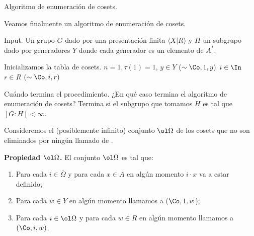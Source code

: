 \documentclass[aspectratio=169, 9pt]{beamer}
\begin{document}
\begin{frame}[fragile]{Algoritmo de enumeración de cosets.}

Veamos finalmente un algoritmo de enumeración de cosets.


\begin{alertblock}{Input.}
	Un grupo $G$ dado por una presentación finita $\langle X | R \rangle$ y $H$ un subgrupo \fg dado por generadores $Y$ donde cada generador es un elemento de $A^*$.
\end{alertblock}
\pause
\begin{codebox}
	\li  \Comment Inicializamos la tabla de cosets.
	\li $n=1, \tau(1)=1$,
	\li \For  $y \in Y$ 
		\Do \li \scanfill$(\sim \Co, 1, y)$  
	\End
	\li \For $i \in \In$
	 \Do \li \For $r \in R$
	 \Do \li \For \scanfill$(\sim \Co, i, r)$
	 \End
	  \End
	\End
\end{codebox}


\end{frame}





\begin{frame}[fragile]{Cuándo termina el procedimiento.}
	¿En qué caso termina el algoritmo de enumeración de cosets?
	\pause
	Termina si el subgrupo que tomamos $H$ es tal que $[G:H] < \infty$.
	\pause

	Consideremos el (posiblemente infinito) conjunto $\ol \Omega$ de los cosets que no son eliminados por ningún llamado de \coin.

	
	\pause
	\textbf{Propiedad $\ol \Omega$.} El conjunto $\ol \Omega$ es tal que:
	\begin{enumerate}
		\item Para cada $i \in \overline \Omega$ y para cada $x \in A$ en algún momento $i \cdot x$ va a estar definido;
		\item Para cada $w \in Y$ en algún momento llamamos a \scanfill($\Co,{1},w$);
		\item Para cada $i \in \ol \Omega$ y para cada $w \in R$ en algún momento llamamos a \scanfill$(\Co,i, w)$.
	\end{enumerate}
\end{frame}
\end{document}
